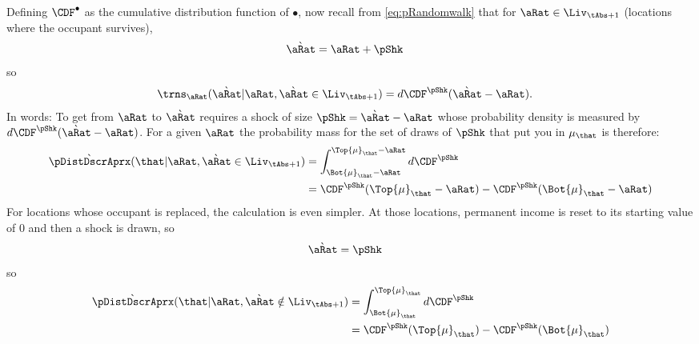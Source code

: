 \documentclass[../BufferStockTheory.tex]{subfiles}\usepackage{ApndxSteadyState}
\begin{document}
  Defining $\CDF^{\bullet}$ as the cumulative distribution function of $\bullet$, now recall from \eqref{eq:pRandomwalk} that for $\point \in \Liv_{\tAbs+1}$ (locations where the occupant survives),
  \begin{equation}\begin{gathered}\begin{aligned}
    \Nxt{\point} & = \point+\pShk
  \end{aligned}\end{gathered}\end{equation}
  so
  \begin{equation}\begin{gathered}\begin{aligned}
    \trns_{\point}(\Nxt{\point}|\point, \Nxt{\point} \in \Liv_{\tAbs+1}) &=  d{\CDF^{\pShk}(\Nxt{\point}-\point)}.
  \end{aligned}\end{gathered}\end{equation}
  In words: To get from $\point$ to $\Nxt{\point}$ requires a shock of size $\pShk = \Nxt{\point}-\point$ whose probability density is measured by $d\CDF^{\pShk}(\Nxt{\point}-\point)$.
  For a given $\point$ the probability mass for the set of draws of $\pShk$ that put you in $\SetSub_{\that}$ is therefore:
  \newcommand{\erf}{\text{erf}}
  \begin{equation}\begin{gathered}\begin{aligned}
    \Nxt{\pDistDscrAprx}(\that|\point,\Nxt{\point}\in\Liv_{\tAbs+1})  &= \int_{\Bot{\SetSub}_{\that}-\point}^{\Top{\SetSub}_{\that}-\point} d{\CDF^{\pShk}}
    \\ & = \CDF^{\pShk}(\Top{\SetSub}_{\that}-\point)-\CDF^{\pShk}(\Bot{\SetSub}_{\that}-\point) \notag
  \end{aligned}\end{gathered}\end{equation}
  For locations whose occupant is replaced, the calculation is even simpler.  At those locations, permanent income is reset to its starting value of 0 and then a shock is drawn, so
  \begin{equation}\begin{gathered}\begin{aligned}
    \Nxt{\point} &= \pShk
  \end{aligned}\end{gathered}\end{equation}
  so
  \renewcommand{\Die}{(1-\Liv)}
  \begin{equation}\begin{gathered}\begin{aligned}
    \Nxt{\pDistDscrAprx}(\that|\point,\Nxt{\point}\notin\Liv_{\tAbs+1})  &= \int_{\Bot{\SetSub}_{\that}}^{\Top{\SetSub}_{\that}} d{\CDF^{\pShk}}
    \\ & = \CDF^{\pShk}(\Top{\SetSub}_{\that})-\CDF^{\pShk}(\Bot{\SetSub}_{\that}) \notag
  \end{aligned}\end{gathered}\end{equation}
\end{document}

